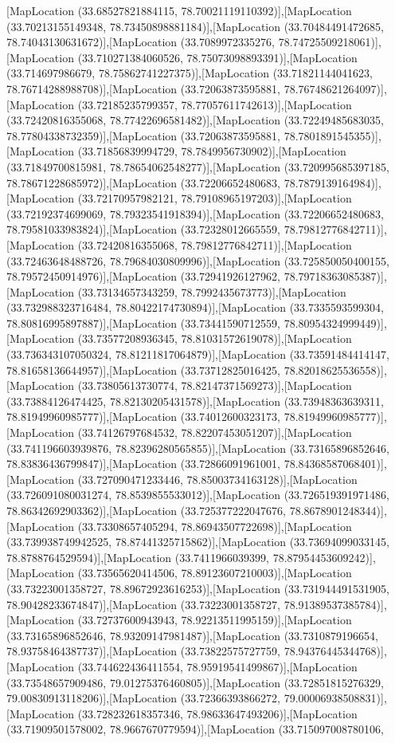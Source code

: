 [MapLocation (33.68527821884115, 78.70021119110392)],[MapLocation (33.70213155149348, 78.73450898881184)],[MapLocation (33.70484491472685, 78.74043130631672)],[MapLocation (33.7089972335276, 78.74725509218061)],[MapLocation (33.710271384060526, 78.75073098893391)],[MapLocation (33.714697986679, 78.75862741227375)],[MapLocation (33.71821144041623, 78.76714288988708)],[MapLocation (33.72063873595881, 78.76748621264097)],[MapLocation (33.72185235799357, 78.77057611742613)],[MapLocation (33.72420816355068, 78.77422696581482)],[MapLocation (33.72249485683035, 78.77804338732359)],[MapLocation (33.72063873595881, 78.7801891545355)],[MapLocation (33.71856839994729, 78.7849956730902)],[MapLocation (33.71849700815981, 78.78654062548277)],[MapLocation (33.720995685397185, 78.78671228685972)],[MapLocation (33.72206652480683, 78.7879139164984)],[MapLocation (33.72170957982121, 78.79108965197203)],[MapLocation (33.72192374699069, 78.79323541918394)],[MapLocation (33.72206652480683, 78.79581033983824)],[MapLocation (33.72328012665559, 78.79812776842711)],[MapLocation (33.72420816355068, 78.79812776842711)],[MapLocation (33.72463648488726, 78.79684030809996)],[MapLocation (33.725850050400155, 78.79572450914976)],[MapLocation (33.72941926127962, 78.79718363085387)],[MapLocation (33.73134657343259, 78.7992435673773)],[MapLocation (33.732988323716484, 78.80422174730894)],[MapLocation (33.7335593599304, 78.80816995897887)],[MapLocation (33.73441590712559, 78.80954324999449)],[MapLocation (33.73577208936345, 78.81031572619078)],[MapLocation (33.736343107050324, 78.81211817064879)],[MapLocation (33.73591484414147, 78.81658136644957)],[MapLocation (33.73712825016425, 78.82018625536558)],[MapLocation (33.73805613730774, 78.82147371569273)],[MapLocation (33.73884126474425, 78.82130205431578)],[MapLocation (33.73948363639311, 78.81949960985777)],[MapLocation (33.74012600323173, 78.81949960985777)],[MapLocation (33.74126797684532, 78.82207453051207)],[MapLocation (33.741196603939876, 78.82396280565855)],[MapLocation (33.73165896852646, 78.83836436799847)],[MapLocation (33.72866091961001, 78.84368587068401)],[MapLocation (33.727090471233446, 78.85003734163128)],[MapLocation (33.726091080031274, 78.8539855533012)],[MapLocation (33.726519391971486, 78.86342692903362)],[MapLocation (33.725377222047676, 78.8678901248344)],[MapLocation (33.73308657405294, 78.86943507722698)],[MapLocation (33.739938749942525, 78.87441325715862)],[MapLocation (33.73694099033145, 78.8788764529594)],[MapLocation (33.7411966039399, 78.87954453609242)],[MapLocation (33.73565620414506, 78.89123607210003)],[MapLocation (33.73223001358727, 78.89672923616253)],[MapLocation (33.731944491531905, 78.90428233674847)],[MapLocation (33.73223001358727, 78.91389537385784)],[MapLocation (33.72737600943943, 78.92213511995159)],[MapLocation (33.73165896852646, 78.93209147981487)],[MapLocation (33.7310879196654, 78.93758464387737)],[MapLocation (33.73822575727759, 78.94376445344768)],[MapLocation (33.744622436411554, 78.95919541499867)],[MapLocation (33.73548657909486, 79.01275376460805)],[MapLocation (33.72851815276329, 79.00830913118206)],[MapLocation (33.72366393866272, 79.00006938508831)],[MapLocation (33.728232618357346, 78.98633647493206)],[MapLocation (33.71909501578002, 78.9667670779594)],[MapLocation (33.715097008780106, 